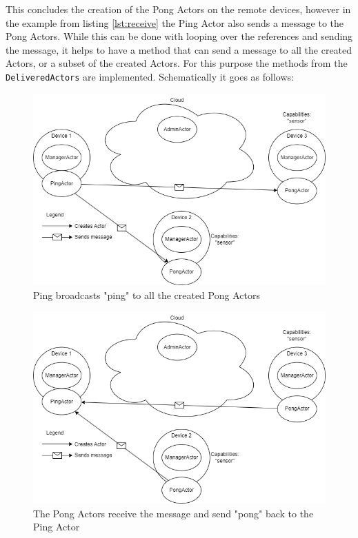\documentclass[a4paper]{article}
\begin{document}
This concludes the creation of the Pong Actors on the remote devices, however in the example from listing \ref{lst:receive} the Ping Actor also sends a message to the Pong Actors. While this can be done with looping over the references and sending the message, it helps to have a method that can send a message to all the created Actors, or a subset of the created Actors. For this purpose the methods from the \lstinline|DeliveredActors| are implemented. Schematically it goes as follows:
\begin{figure}[H]
    \centering
    \includegraphics[scale=0.5]{createActor5.png}
    \caption{Ping broadcasts "ping" to all the created Pong Actors}
    \label{fig:createActor5}
\end{figure}
\begin{figure}[H]
    \centering
    \includegraphics[scale=0.5]{createActor6.png}
    \caption{The Pong Actors receive the message and send "pong" back to the Ping Actor}
    \label{fig:createActor6}
\end{figure}
\end{document}
